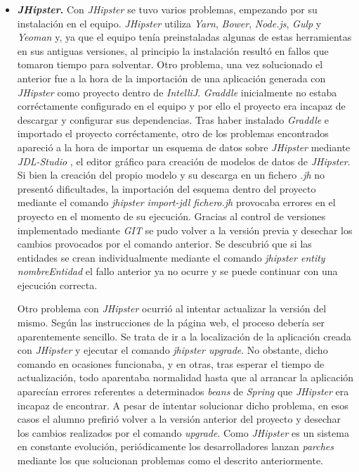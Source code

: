 \begin{itemize}
\item \textbf{\textit{JHipster}.} Con \textit{JHipster} se tuvo varios problemas, empezando por su instalación en el equipo. \textit{JHipster} utiliza \textit{Yarn}, \textit{Bower}, \textit{Node.js}, \textit{Gulp} y \textit{Yeoman} y, ya que el equipo tenía preinstaladas algunas de estas herramientas en sus antiguas versiones, al principio la instalación resultó en fallos que tomaron tiempo para solventar. Otro problema, una vez solucionado el anterior fue a la hora de la importación de una aplicación generada con \textit{JHipster} como proyecto dentro de \textit{IntelliJ}. \textit{Graddle} inicialmente no estaba corréctamente configurado en el equipo y por ello el proyecto era incapaz de descargar y configurar sus dependencias. Tras haber instalado \textit{Graddle} e importado el proyecto corréctamente, otro de los problemas encontrados apareció a la hora de importar un esquema de datos sobre \textit{JHipster} mediante \textit{JDL-Studio} \cite{jdlstudio}, el editor gráfico para creación de modelos de datos de \textit{JHipster}. Si bien la creación del propio modelo y su descarga en un fichero  \textit{.jh} no presentó dificultades, la importación del esquema dentro del proyecto mediante el comando \textit{jhipster import-jdl fichero.jh} provocaba errores en el proyecto en el momento de su ejecución. Gracias al control de versiones implementado mediante \textit{GIT} \cite{git} se pudo volver a la versión previa y desechar los cambios provocados por el comando anterior. Se descubrió que si las entidades se crean individualmente mediante el comando \textit{jhipster entity nombreEntidad} el fallo anterior ya no ocurre y se puede continuar con una ejecución correcta. 
\par 
Otro problema con \textit{JHipster} ocurrió al intentar actualizar la versión del mismo. Según las instrucciones de la página web, el proceso debería ser aparentemente sencillo. Se trata de ir a la localización de la aplicación creada con \textit{JHipster} y ejecutar el comando \textit{jhipster upgrade}. No obstante, dicho comando en ocasiones funcionaba, y en otras, tras esperar el tiempo de actualización, todo aparentaba normalidad hasta que al arrancar la aplicación aparecían errores referentes a determinados \textit{beans} de \textit{Spring} que \textit{JHipster} era incapaz de encontrar. A pesar de intentar solucionar dicho problema, en esos casos el alumno prefirió volver a la versión anterior del proyecto y desechar los cambios realizados por el comando \textit{upgrade}. Como \textit{JHipster} es un sistema en constante evolución, periódicamente los desarrolladores lanzan \textit{parches} mediante los que solucionan problemas como el descrito anteriormente. 


\end{itemize}
